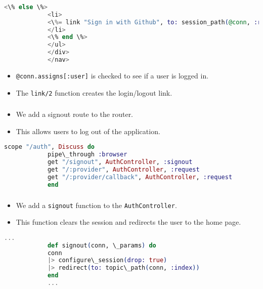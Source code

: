 \documentclass[aspectratio=169, table]{beamer}
\begin{document}
	\begin{frame}[fragile]
		\frametitle{}
		\begin{lstlisting}[language=Elixir]
			<\% else \%>
			<li>
			<\%= link "Sign in with Github", to: session_path(@conn, :request, "github") \%>
			</li>
			<\% end \%>
			</ul>
			</div>
			</nav>
		\end{lstlisting}
		\begin{itemize}
			\item \texttt{@conn.assigns[:user]} is checked to see if a user is logged in.
			\item The \texttt{link/2} function creates the login/logout link.
		\end{itemize}
	\end{frame}
	
	\begin{frame}[fragile]
		\frametitle{}
		\begin{itemize}
			\item We add a signout route to the router.
			\item This allows users to log out of the application.
		\end{itemize}
		\begin{lstlisting}[language=Elixir]
			scope "/auth", Discuss do
			pipe\_through :browser
			get "/signout", AuthController, :signout
			get "/:provider", AuthController, :request
			get "/:provider/callback", AuthController, :request
			end
		\end{lstlisting}
	\end{frame}
	
	\begin{frame}[fragile]
		\frametitle{}
		\begin{itemize}
			\item We add a \texttt{signout} function to the \texttt{AuthController}.
			\item This function clears the session and redirects the user to the home page.
		\end{itemize}
		\begin{lstlisting}[language=Elixir]
			...
			def signout(conn, \_params) do
			conn
			|> configure\_session(drop: true)
			|> redirect(to: topic\_path(conn, :index))
			end
			...
		\end{lstlisting}
	\end{frame}
	
\end{document}
